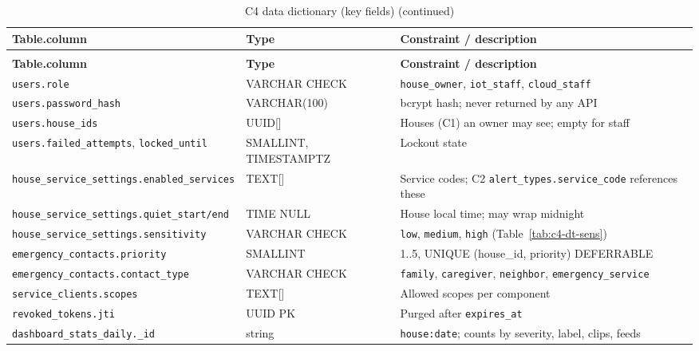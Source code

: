 
\begin{longtable}{L{4.4cm}L{3.0cm}L{7.2cm}}
\caption{C4 data dictionary (key fields)}\label{tab:c4-dd}\\
\toprule
\textbf{Table.column} & \textbf{Type} & \textbf{Constraint / description} \\
\midrule
\endfirsthead
\caption[]{C4 data dictionary (key fields) (continued)}\\
\toprule
\textbf{Table.column} & \textbf{Type} & \textbf{Constraint / description} \\
\midrule
\endhead
\texttt{users.role} & VARCHAR CHECK & \texttt{house\_owner}, \texttt{iot\_staff}, \texttt{cloud\_staff} \\
\texttt{users.password\_hash} & VARCHAR(100) & bcrypt hash; never returned by any API \\
\texttt{users.house\_ids} & UUID[] & Houses (C1) an owner may see; empty for staff \\
\texttt{users.failed\_attempts}, \texttt{locked\_until} & SMALLINT, TIMESTAMPTZ & Lockout state \\
\texttt{house\_service\_settings.enabled\_services} & TEXT[] & Service codes; C2 \texttt{alert\_types.service\_code} references these \\
\texttt{house\_service\_settings.quiet\_start/end} & TIME NULL & House local time; may wrap midnight \\
\texttt{house\_service\_settings.sensitivity} & VARCHAR CHECK & \texttt{low}, \texttt{medium}, \texttt{high} (Table~\ref{tab:c4-dt-sens}) \\
\texttt{emergency\_contacts.priority} & SMALLINT & 1..5, UNIQUE (house\_id, priority) DEFERRABLE \\
\texttt{emergency\_contacts.contact\_type} & VARCHAR CHECK & \texttt{family}, \texttt{caregiver}, \texttt{neighbor}, \texttt{emergency\_service} \\
\texttt{service\_clients.scopes} & TEXT[] & Allowed scopes per component \\
\texttt{revoked\_tokens.jti} & UUID PK & Purged after \texttt{expires\_at} \\
\texttt{dashboard\_stats\_daily.\_id} & string & \texttt{house:date}; counts by severity, label, clips, feeds \\
\bottomrule
\end{longtable}

